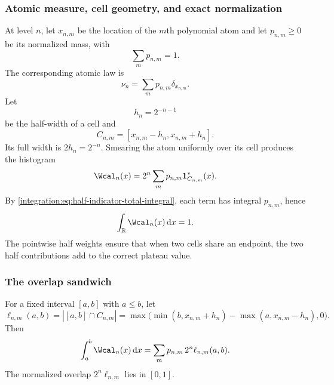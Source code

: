 \documentclass[11pt,oneside]{article}
\theoremstyle{definition}
\theoremstyle{remark}
\newcommand{\R}{\mathbb R}
\newcommand{\dd}{\,\mathrm d}
\begin{document}
\subsubsection{Atomic measure, cell geometry, and exact normalization}

At level $n$, let $x_{n,m}$ be the location of the $m$th polynomial atom and let
$p_{n,m}\ge0$ be its normalized mass, with
\begin{equation}
 \sum_m p_{n,m}=1.
 \label{integration:eq:atomic-mass-one}
\end{equation}
The corresponding atomic law is
\begin{equation}
 \nu_n=\sum_m p_{n,m}\delta_{x_{n,m}}.
 \label{integration:eq:polynomial-atomic-law}
\end{equation}
Let
\begin{equation}
 h_n=2^{-n-1}
 \label{integration:eq:step-half-width}
\end{equation}
be the half-width of a cell and
\begin{equation}
 C_{n,m}=[x_{n,m}-h_n,x_{n,m}+h_n].
 \label{integration:eq:step-cell}
\end{equation}
Its full width is $2h_n=2^{-n}$.  Smearing the atom uniformly over its cell produces the
histogram
\begin{equation}
 \Wcal_n(x)=2^n\sum_m p_{n,m}\mathbf1^*_{C_{n,m}}(x).
 \label{integration:eq:histogram-from-atoms}
\end{equation}
By \eqref{integration:eq:half-indicator-total-integral}, each term has integral $p_{n,m}$, hence
\begin{equation}
 \int_\R\Wcal_n(x)\dd x=1.
 \label{integration:eq:histogram-mass-one}
\end{equation}
The pointwise half weights ensure that when two cells share an endpoint, the two half
contributions add to the correct plateau value.

\subsubsection{The overlap sandwich}

For a fixed interval $[a,b]$ with $a\le b$, let
\begin{equation}
 \ell_{n,m}(a,b)=|[a,b]\cap C_{n,m}|
 =\max\bigl(\min(b,x_{n,m}+h_n)-\max(a,x_{n,m}-h_n),0\bigr).
 \label{integration:eq:cell-overlap-length}
\end{equation}
Then
\begin{equation}
 \int_a^b\Wcal_n(x)\dd x
 =\sum_m p_{n,m}\,2^n\ell_{n,m}(a,b).
 \label{integration:eq:histogram-overlap-sum}
\end{equation}
The normalized overlap $2^n\ell_{n,m}$ lies in $[0,1]$.
\end{document}
